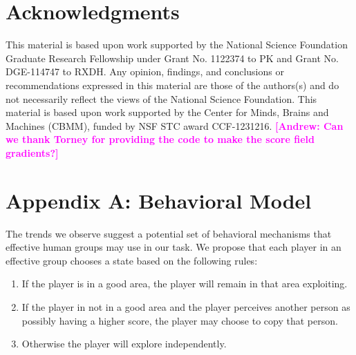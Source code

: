 \documentclass[12pt,letterpaper]{article}
\newcommand{\andrew}[1]{\textcolor{magenta}{\bf [Andrew: #1]}}
\begin{document}
\section{Acknowledgments}

\small

This material is based upon work supported by the National Science
Foundation Graduate Research Fellowship under Grant No. 1122374 to PK
and Grant No. DGE-114747 to RXDH. Any opinion, findings, and
conclusions or recommendations expressed in this material are those of
the authors(s) and do not necessarily reflect the views of the
National Science Foundation.  This material is based upon work
supported by the Center for Minds, Brains and Machines (CBMM), funded
by NSF STC award CCF-1231216.
\andrew{Can we thank Torney for providing the code to make the score field gradients?}




\setlength{\bibleftmargin}{.125in}
\setlength{\bibindent}{-\bibleftmargin}

\small{
  
}


\section*{Appendix A: Behavioral Model}

The trends we observe suggest a potential set of behavioral mechanisms
that effective human groups may use in our task.  We propose that each
player in an effective group chooses a state based on the following
rules:
\begin{enumerate}
\item
  If the player is in a good area, the player will remain in that area
  exploiting.
\item
  If the player in not in a good area and the player perceives another
  person as possibly having a higher score, the player may choose to
  copy that person.
\item
  Otherwise the player will explore independently.
\end{enumerate}
\end{document}
